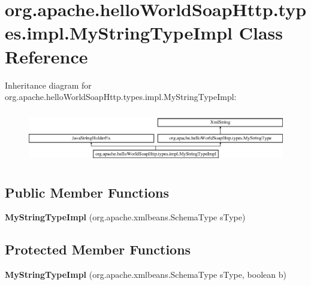 \hypertarget{classorg_1_1apache_1_1hello_world_soap_http_1_1types_1_1impl_1_1_my_string_type_impl}{}\section{org.\+apache.\+hello\+World\+Soap\+Http.\+types.\+impl.\+My\+String\+Type\+Impl Class Reference}
\label{classorg_1_1apache_1_1hello_world_soap_http_1_1types_1_1impl_1_1_my_string_type_impl}
Inheritance diagram for org.\+apache.\+hello\+World\+Soap\+Http.\+types.\+impl.\+My\+String\+Type\+Impl\+:\begin{figure}[H]
\begin{center}
\leavevmode
\includegraphics[height=2.301370cm]{classorg_1_1apache_1_1hello_world_soap_http_1_1types_1_1impl_1_1_my_string_type_impl}
\end{center}
\end{figure}
\subsection*{Public Member Functions}
\begin{DoxyCompactItemize}
\item 
\hypertarget{classorg_1_1apache_1_1hello_world_soap_http_1_1types_1_1impl_1_1_my_string_type_impl_a57e727d516bf476703837f35f9040e3b}{}{\bfseries My\+String\+Type\+Impl} (org.\+apache.\+xmlbeans.\+Schema\+Type s\+Type)\label{classorg_1_1apache_1_1hello_world_soap_http_1_1types_1_1impl_1_1_my_string_type_impl_a57e727d516bf476703837f35f9040e3b}

\end{DoxyCompactItemize}
\subsection*{Protected Member Functions}
\begin{DoxyCompactItemize}
\item 
\hypertarget{classorg_1_1apache_1_1hello_world_soap_http_1_1types_1_1impl_1_1_my_string_type_impl_ab03592815b81078a96b3be3d42c2e875}{}{\bfseries My\+String\+Type\+Impl} (org.\+apache.\+xmlbeans.\+Schema\+Type s\+Type, boolean b)\label{classorg_1_1apache_1_1hello_world_soap_http_1_1types_1_1impl_1_1_my_string_type_impl_ab03592815b81078a96b3be3d42c2e875}

\end{DoxyCompactItemize}
